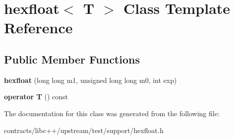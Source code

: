 \hypertarget{classhexfloat}{}\section{hexfloat$<$ T $>$ Class Template Reference}
\label{classhexfloat}
\subsection*{Public Member Functions}
\begin{DoxyCompactItemize}
\item 
\mbox{\label{classhexfloat_a3f7231643cfe5d72cf0b07a4ce694b8f}} 
{\bfseries hexfloat} (long long m1, unsigned long long m0, int exp)
\item 
\mbox{\label{classhexfloat_a03c1bb445787816c41875ec974e95293}} 
{\bfseries operator T} () const
\end{DoxyCompactItemize}


The documentation for this class was generated from the following file\+:\begin{DoxyCompactItemize}
\item 
contracts/libc++/upstream/test/support/hexfloat.\+h\end{DoxyCompactItemize}
